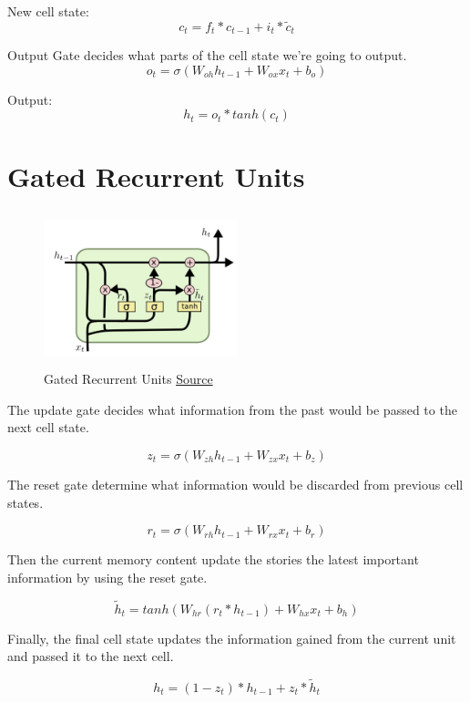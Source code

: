 New cell state:
\[c_t = f_t*c_{t-1} + i_t*\widetilde{c}_t\]

Output Gate decides what parts of the cell state we’re going to output.
\[o_t = \sigma(W_{oh}h_{t-1} + W_{ox}x_t + b_o)\]

Output:
\[h_t = o_t*tanh(c_t)\]

\section{Gated Recurrent Units}

\begin{figure}[h]
  \centering
      \includegraphics[width=0.5\textwidth,height=4.5cm]{lectures/06-b-rnn/image/GRU.png}
          \caption{
            Gated Recurrent Units
            \href{http://colah.github.io/posts/2015-08-Understanding-LSTMs/}{Source}
          }
          \label{fig:lstm}
\end{figure}

The update gate decides what information from the past would be passed to the next cell state.

\[z_t = \sigma(W_{zh}h_{t-1}+W_{zx}x_t + b_z) \]

The reset gate determine what information would be discarded from previous cell states.

\[r_t = \sigma(W_{rh}h_{t-1}+W_{rx}x_t + b_r) \]

Then the current memory content update the stories the latest important information by using the reset gate.

\[\widetilde{h}_t = tanh(W_{hr}(r_t*h_{t-1}) + W_{hx}x_t + b_h)\]

Finally, the final cell state updates the information gained from the current unit and passed it to the next cell.

\[h_t = (1-z_t)*h_{t-1} + z_t*\widetilde{h}_t\]